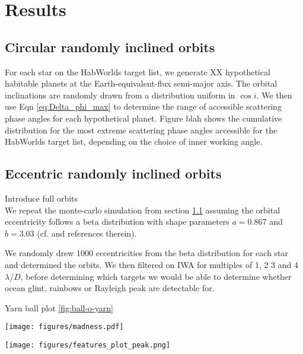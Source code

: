 \documentclass[
    usenatbib,
]{mnras}
\newcommand{\IWA}{\ensuremath{\mathrm{IWA}}}
\begin{document}
\section{Results}

\subsection{Circular randomly inclined orbits}
\label{sec:circular}
For each star on the HabWorlds target list, we generate XX hypothetical habitable planets at the Earth-equivalent-flux semi-major axis. The orbital inclinations are randomly drawn from a distribution uniform in $\cos i$. We then use Eqn \ref{eq:Delta_phi_max} to determine the range of accessible scattering phase angles for each hypothetical planet. Figure blah shows the cumulative distribution for the most extreme scattering phase angles accessible for the HabWorlds target list, depending on the choice of inner working angle.  

\subsection{Eccentric randomly inclined orbits}
\label{sec:eccentric}
Introduce full orbits \\

We repeat the monte-carlo simulation from section \ref{sec:circular} assuming the orbital eccentricity follows a beta distribution with shape parameters $a=0.867$ and $b=3.03$ (cf. \citet{Guimond_2019} and references therein).

We randomly drew 1000 eccentricities from the beta distribution for each star and determined the orbits. We then filtered on IWA for multiples of 1, 2 3 and 4 $\lambda / D$, before determining which targets we would be able to determine whether ocean glint, rainbows or Rayleigh peak are detectable for.

Yarn ball plot \cref{fig:ball-o-yarn} \\

\begin{figure*}
    \centering
    \texttt{[image: figures/madness.pdf]}  
    \caption{
        Eccentric orbits for the stellar sample $\IWA$ of 1, 2, 3 and 4~$\lambda / D$ corresponding to 21, 42, 63 and 84 mas.
        The habitable zone is identified in each panel. 
    }
    \label{fig:ball-o-yarn}
\end{figure*}
 
\begin{figure*}
    \centering
    \texttt{[image: figures/features\_plot\_peak.png]}  
    \caption{
        Number of systems vs inner working angle
    }
    \label{fig:accessible_phase_angles}
\end{figure*}
\end{document}
